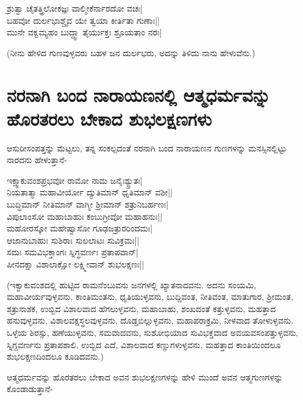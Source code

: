 \begin{shloka} 
ಶ್ರುತ್ವಾ ಚೈತತ್ತ್ರಿಲೋಕಜ್ಞಃ ವಾಲ್ಮೀಕೆರ್ನಾರದೋ ವಚಃ|\label{153c}\\ 
ಬಹವೋ ದುರ್ಲಭಾಶ್ಚೈವ ಯೇ ತ್ವಯಾ ಕೀರ್ತಿತಾ ಗುಣಾಃ||\\ 
ಮುನೇ ವಕ್ವಮ್ಯಹಂ ಬುದ್ದ್ವಾ ತೈರ್ಯುಕ್ತಃ ಶ್ರೂಯತಾಂ ನರಃ|
\end{shloka} 

(ನೀನು ಹೇಳಿದ ಗುಣವುಳ್ಳವರು ಬಹಳ ಜನ ದುರ್ಲಭರು, ಅದನ್ನು ತಿಳಿದು ನಾನು ಹೇಳುವೆನು.) 

\section*{ನರನಾಗಿ ಬಂದ ನಾರಾಯಣನಲ್ಲಿ ಆತ್ಮಧರ್ಮವನ್ನು ಹೊರತರಲು ಬೇಕಾದ ಶುಭಲಕ್ಷಣಗಳು} 

ಆಸುರೀಸಂಪತ್ತನ್ನು ಮೆಟ್ಟಲು, ತನ್ನ ಸಂಕಲ್ಪದಂತೆ ನರನಾಗಿ ಬಂದ ನಾರಾಯಣನ ಗುಣಗಳನ್ನು ಮನಸ್ಸಿನಲ್ಲಿಟ್ಟು ನಾರದನು ಹೇಳುತ್ತಾನೆ- 

\begin{shloka} 
ಇಕ್ಷ್ವಾಕುವಂಶಪ್ರಭವೋ ರಾಮೋ ನಾಮ ಜನೈಃಶ್ಯ್ರುತಃ|\label{154}\\ 
ನಿಯತಾತ್ಮಾ ಮಹಾವೀರ್ಯೋ ದ್ಯುತಿಮಾನ್ ಧೃತಿಮಾನ್ ವಶೀ||\\ 
ಬುದ್ಧಿಮಾನ್ ನೀತಿಮಾನ್ ವಾಗ್ಮೀ ಶ್ರೀಮಾನ್ ಶತ್ರುನಿಬರ್ಹಣಃ|\\ 
ವಿಪುಲಾಂಸೋ ಮಹಾಬಾಹುಃ ಕಂಬುಗ್ರೀವೋ ಮಹಾಹನುಃ||\\ 
ಮಹೋರಸ್ಕೋ ಮಹೇಷ್ವಾಸೋ ಗೂಢಜತ್ರುರರಿಂದಮಃ|\\ 
ಆಜಾನುಬಾಹುಃ ಸುಶಿರಾಃ ಸುಲಲಾಟಃ ಸುವಿಕ್ರಮಃ||\\ 
ಸಮಃ ಸಮವಿಭಕ್ತಾಂಗಃ ಸ್ನಿಗ್ಧವರ್ಣಃ ಪ್ರತಾಪವಾನ್|\\ 
ಪೀನದಕ್ಷಾ ವಿಶಾಲಾಕ್ಷೋ ಲಕ್ಷ್ಮೀವಾನ್ ಶುಭಲಕ್ಷಣಃ||
\end{shloka} 

(ಇಕ್ವಾಕುವಂಶದಲ್ಲಿ ಹುಟ್ಟಿದ ರಾಮನೆಂಬುವನು ಜನಗಳಲ್ಲಿ ಖ್ಯಾತನಾದವನು. ಅದನು ಸಂಯಮಿ, ಮಹಾವೀರ್ಯವುಳ್ಳವನು, ಕಾಂತಿಮಂತನು, ಧೃತಿಯುಳ್ಳವನು, ಬುದ್ದಿವಂತ, ನೀತಿವಂತ, ಮಾತುಗಾರ, ಶ್ರೀಮಂತ, ಶತ್ರುನಾಶಕ, ಉಬ್ಬಿದ ವಿಶಾಲವಾದ ಹೆಗಲುಳ್ಳವನು, ಮಹಾಬಾಹು, ಶಂಖದಂತೆ ಕತ್ತುಳ್ಳವನು, ಮಹತ್ತಾದ ಹನುವುಳ್ಳವನು, ವಿಶಾಲವಕ್ಷಸ್ಥಲವುಳ್ಳವನು, ದೊಡ್ಡಬಿಲ್ಲುಳ್ಳವನು, ಮಹಾಪರಾಕ್ರಮಿ, ನೀಳವಾದ ತೋಳುಳ್ಳವನು. ಒಳ್ಳೆಯ ಶಿರಸ್ಸು, ಹಣೆಯುಳ್ಳವನು, ಸಮವಾದವನು, ಸುಶೋಭಿಯಾದ ಸುವಿಭಕ್ತವಾದ ಅವಯವಸಂಪತ್ತುಳ್ಳವನು, ಸ್ನಿಗ್ದವರ್ಣನು ಪ್ರತಾಪಶಾಲಿ, ಉಬ್ಬಿದ ಎದೆ, ವಿಶಾಲವಾದ ಕಣ್ಣುಗಳುಳ್ಳವನು, ಮಹತ್ತಾದ ಕಾಂತಿಯಿಂದಲೂ ಶುಭಲಕ್ಷಣದಿಂದಲೂ ಕೂಡಿದವನು.) 

ಆತ್ಮಧರ್ಮವನ್ನು ಹೊರತರಲು ಬೇಕಾದ ಅವನ ಶುಭಲಕ್ಷಣಗಳನ್ನು ಹೇಳಿ ಮುಂದೆ ಅವನ ಆತ್ಮಗುಣಗಳನ್ನು ಕೊಂಡಾಡುತ್ತಾನೆ- 

